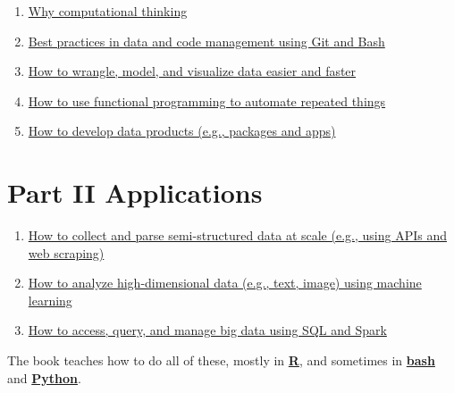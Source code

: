 \documentclass[
]{book}
\begin{document}
\begin{enumerate}
\def\labelenumi{\arabic{enumi}.}
\item
  \protect\hyperlink{motivation}{Why computational thinking}
\item
  \protect\hyperlink{git_bash}{Best practices in data and code management using Git and Bash}
\item
  \protect\hyperlink{tidy_data}{How to wrangle, model, and visualize data easier and faster}
\item
  \protect\hyperlink{functional_programming}{How to use functional programming to automate repeated things}
\item
  \protect\hyperlink{products}{How to develop data products (e.g., packages and apps)}
\end{enumerate}

\hypertarget{part-ii-applications}{%
\section{Part II Applications}\label{part-ii-applications}}

\begin{enumerate}
\def\labelenumi{\arabic{enumi}.}
\setcounter{enumi}{5}
\item
  \protect\hyperlink{semi_structured_data}{How to collect and parse semi-structured data at scale (e.g., using APIs and web scraping)}
\item
  \protect\hyperlink{machine_learning}{How to analyze high-dimensional data (e.g., text, image) using machine learning}
\item
  \protect\hyperlink{big_data}{How to access, query, and manage big data using SQL and Spark}
\end{enumerate}

The book teaches how to do all of these, mostly in \href{https://www.r-project.org/about.html}{\textbf{R}}, and sometimes in \href{https://www.gnu.org/software/bash/}{\textbf{bash}} and \href{https://www.python.org/about/}{\textbf{Python}}.
\end{document}
